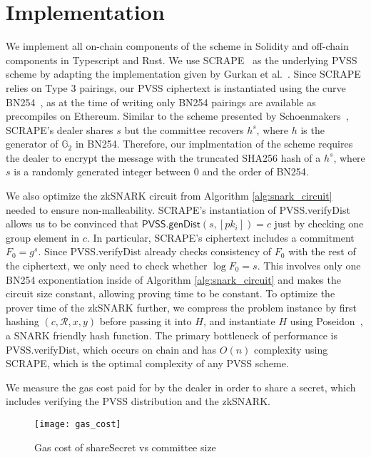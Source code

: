 \section{Implementation}

We implement all on-chain components of the scheme in Solidity and off-chain components in Typescript and Rust.
We use SCRAPE~\cite{pvss_scrape} as the underlying PVSS scheme by adapting the implementation given by Gurkan et al.~\cite{aggregatable_dkg}.
Since SCRAPE relies on Type 3 pairings, our PVSS ciphertext is instantiated using the curve BN254~\cite{bn254}, as at the time of writing only BN254 pairings are available as precompiles on Ethereum.
Similar to the scheme presented by Schoenmakers~\cite{pvss_schoenmakers}, SCRAPE's dealer shares $s$ but the committee recovers $h^s$, where $h$ is the generator of $\mathbb{G}_2$ in BN254.
Therefore, our implmentation of the scheme requires the dealer to encrypt the message with the truncated SHA256 hash of a $h^s$, where $s$ is a randomly generated integer between 0 and the order of BN254.

We also optimize the zkSNARK circuit from Algorithm \ref{alg:snark_circuit} needed to ensure non-malleability.
SCRAPE's instantiation of \textsf{PVSS.verifyDist} allows us to be convinced that $\textsf{PVSS.genDist}(s, [pk_i]) = c$ just by checking one group element in $c$.
In particular, SCRAPE's ciphertext includes a commitment $F_0 = g^s$.
Since \textsf{PVSS.verifyDist} already checks consistency of $F_0$ with the rest of the ciphertext, we only need to check whether $\log F_0 = s$.
This involves only one BN254 exponentiation inside of Algorithm \ref{alg:snark_circuit} and makes the circuit size constant, allowing proving time to be constant.
To optimize the prover time of the zkSNARK further, we compress the problem instance by first hashing $(c, \mathcal{R}, x, y)$ before passing it into $H$, and instantiate $H$ using Poseidon~\cite{poseidon}, a SNARK friendly hash function.
The primary bottleneck of performance is \textsf{PVSS.verifyDist}, which occurs on chain and has $O(n)$ complexity using SCRAPE, which is the optimal complexity of any PVSS scheme.


We measure the gas cost paid for by the dealer in order to share a secret, which includes verifying the PVSS distribution and the zkSNARK.
\begin{figure}
\caption{Gas cost of \textsf{shareSecret} vs committee size}
\texttt{[image: gas\_cost]}
\end{figure}

